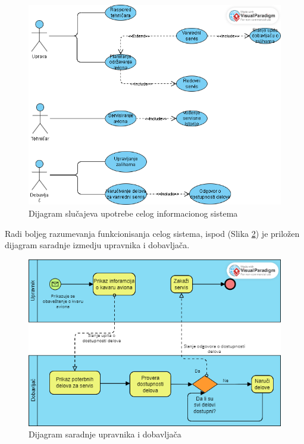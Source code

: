 \documentclass[a4paper]{article}
\begin{document}
\begin{figure}[H]
\begin{center}
\includegraphics[scale=0.55]{Dijagrami/Dijagrami_slucajeva_upotrebe/Dijagram_slučajeva_upotrebe_celog_informacionog_sistema.png}
\end{center}
\caption{Dijagram slučajeva upotrebe celog informacionog sistema}
\label{fig:ceo_sistem}
\end{figure}

Radi boljeg razumevanja funkcionisanja celog sistema, ispod (Slika \ref{fig:bpmn_dijargram_saradnje}) je priložen dijagram saradnje izmedju upravnika i dobavljača.

\begin{figure}[H]
\begin{center}
\includegraphics[scale=0.6]{Dijagrami/BPMN_Dijagrami/Dijagram_saradnje_upravnik_dobavljac.png}
\end{center}
\caption{Dijagram saradnje upravnika i dobavljača}
\label{fig:bpmn_dijargram_saradnje}
\end{figure}
\end{document}
